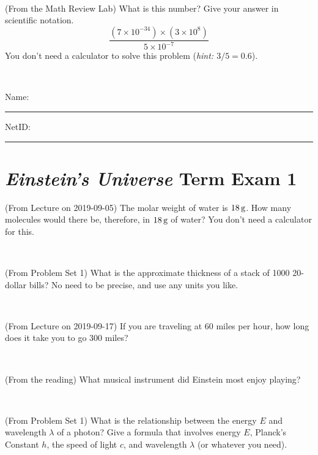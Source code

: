 \documentclass[12pt, letterpaper]{article}
\begin{document}
\vfill ~

\begin{problem} (From the Math Review Lab)
What is this number? Give your answer in scientific notation.
$$
\frac{(7\times10^{-34})\times(3\times10^8)}{5\times10^{-7}}
$$
You don't need a calculator to solve this problem (\textit{hint: $3/5=0.6$}).
\end{problem}


\vfill ~


\cleardoublepage



\noindent
Name: \rule[-1ex]{0.60\textwidth}{0.1pt}
NetID: \rule[-1ex]{0.20\textwidth}{0.1pt}

\section*{\textsl{Einstein's Universe} Term Exam 1}
\setcounter{problem}{1}


\begin{problem} (From Lecture on 2019-09-05)
The molar weight of water is $18\,\mathrm{g}$. How many molecules would there
be, therefore, in $18\,\mathrm{g}$ of water? You don't need a calculator for
this.
\end{problem}


\vfill ~

\begin{problem} (From Problem Set 1)
What is the approximate thickness of a stack of 1000 20-dollar bills?
No need to be precise, and use any units you like.
\end{problem}


\vfill ~

\begin{problem} (From Lecture on 2019-09-17)
If you are traveling at 60 miles per hour, how long does
it take you to go 300 miles?
\end{problem}


\vfill ~

\begin{problem} (From the reading)
What musical instrument did Einstein most enjoy playing?
\end{problem}


\vfill ~


\clearpage


\begin{problem} (From Problem Set 1)
What is the relationship between the energy $E$ and wavelength
$\lambda$ of a photon? Give a formula that involves energy $E$,
Planck's Constant $h$, the speed of light $c$, and wavelength
$\lambda$ (or whatever you need).
\end{problem}
\end{document}
